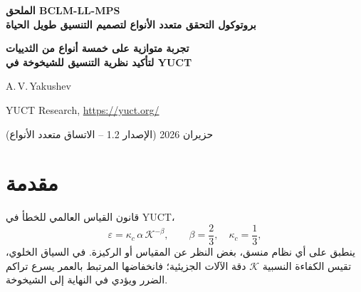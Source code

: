 \documentclass[11pt,a4paper]{article}
\newcommand{\REL}{\mathcal{K}}          %
\begin{document}
	
	\begin{titlepage}
		\centering
		\vspace*{2cm}
		{\Huge\bfseries الملحق BCLM-LL-MPS\\[0.3cm]
			بروتوكول التحقق متعدد الأنواع لتصميم التنسيق طويل الحياة\par}
		\vspace{0.5cm}
		{\Large\bfseries تجربة متوازية على خمسة أنواع من الثدييات\\لتأكيد نظرية التنسيق للشيخوخة في YUCT\par}
		\vspace{1.5cm}
		{\large A.\,V.\,Yakushev\par}
		{\normalsize YUCT Research, \url{https://yuct.org/}\par}
		\vspace{1.0cm}
		{\normalsize حزيران 2026 (الإصدار 1.2 – الاتساق متعدد الأنواع)}\par
		\vfill
		\begin{abstract}
			\noindent
			تسمح لاغرانجية التنسيق البيولوجي في YUCT (BCLM) بالتنبؤ بكفاءة التنسيق \(K_{\mathrm{eff}}\) لأي بروتين أو مسار انطلاقاً من بيانات التسلسل فقط. لإظهار عمومية نظرية التنسيق للشيخوخة، نقدم تصميمًا تجريبيًا متوازيًا لخمسة أنواع من الثدييات شائعة الاستخدام في المختبرات: الفأر (\textit{Mus musculus})، الجرذ (\textit{Rattus norvegicus})، الخنزير (\textit{Sus scrofa})، المكاك آكل السرطان (\textit{Macaca fascicularis})، والكلب (\textit{Canis familiaris}). لكل نوع نحدد الجينات المستهدفة المتجانسة، ونحسب كفاءات التنسيق النسبية الطبيعية والمُحسَّنة \(\REL\) باستخدام مسار BCLM، ونشتق تنبؤات كمية لمعدل الطفرة، والإجهاد التأكسدي، وتجمع البروتين، وسرعة الهجرة، وعمر التضاعف مباشرة من قانون الخطأ العالمي \(\varepsilon = \kappa_c \alpha \REL^{-\beta}\) (\(\beta=2/3\)، \(\kappa_c=1/3\)). يتضمن جدول مقارن القيم المقابلة للخلايا البشرية (من البروتوكول المرافق BCLM‑LL). يعتمد البروتوكول فقط على خطوط الخلايا المتاحة تجارياً، وقواعد بيانات التسلسل العامة، والمقايسات القياسية لبيولوجيا الخلية. تؤكد وحدة الانحدار الخاضع للرقابة (CCR) قابلية عكس النمط الظاهري للشيخوخة عبر الأنواع. جميع التنبؤات مسجلة مسبقاً وقابلة للتكذيب. يحذف البروتوكول عمداً طرق الإيصال \textit{in vivo}؛ وتُناقش الجوانب الأخلاقية في الملحق~\(\Sigma\).
		\end{abstract}
	\end{titlepage}
	
	\tableofcontents
	\newpage
	
	\section{مقدمة}
	\label{sec:intro}
	قانون القياس العالمي للخطأ في YUCT،
	\begin{equation}
		\varepsilon = \kappa_c \, \alpha \, \REL^{-\beta}, \qquad \beta = \frac{2}{3},\quad \kappa_c = \frac{1}{3},
		\label{eq:error-law}
	\end{equation}
	ينطبق على أي نظام منسق، بغض النظر عن المقياس أو الركيزة. في السياق الخلوي، تقيس الكفاءة النسبية \(\REL\) دقة الآلات الجزيئية؛ فانخفاضها المرتبط بالعمر يسرع تراكم الضرر ويؤدي في النهاية إلى الشيخوخة.
	
\end{document}
